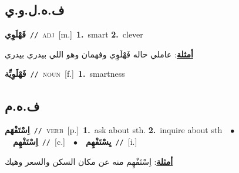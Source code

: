 \documentclass[10pt,a4paper,twoside]{article} %
\begin{document}
\begin{multicols}{2}
\vspace{-3mm}
\subsection*{\color{blue}\foreignlanguage{arabic}{ف.ه.ل.و.ي}\color{blue}{ (ntws)}} 

{\setlength\topsep{0pt}\textbf{\foreignlanguage{arabic}{فَهْلَوِي}}\ {\color{gray}\texttt{//}\color{black}}\ \textsc{adj}\ [m.]\ \textbf{1.}~smart  \textbf{2.}~clever\  \begin{flushright}\color{gray}\foreignlanguage{arabic}{\textbf{\underline{\foreignlanguage{arabic}{أمثلة}}}: عاملي حاله فَهْلَوِي وفهمان وهو اللي بيدري بيدري}\end{flushright}\color{black}} \vspace{2mm}

{\setlength\topsep{0pt}\textbf{\foreignlanguage{arabic}{فَهْلَوِيِّة}}\ {\color{gray}\texttt{//}\color{black}}\ \textsc{noun}\ [f.]\ \textbf{1.}~smartness\ } \vspace{2mm}

\vspace{-3mm}
\subsection*{\color{blue}\foreignlanguage{arabic}{ف.ه.م}\color{blue}{}} 

{\setlength\topsep{0pt}\textbf{\foreignlanguage{arabic}{اِسْتَفْهَم}}\ {\color{gray}\texttt{//}\color{black}}\ \textsc{verb}\ [p.]\ \textbf{1.}~ask about sth.  \textbf{2.}~inquire about sth\ \ $\bullet$\ \ \setlength\topsep{0pt}\textbf{\foreignlanguage{arabic}{اِسْتَفْهِم}}\ {\color{gray}\texttt{//}\color{black}}\ [c.]\ \ $\bullet$\ \ \setlength\topsep{0pt}\textbf{\foreignlanguage{arabic}{يِسْتَفْهِم}}\ {\color{gray}\texttt{//}\color{black}}\ [i.]\  \begin{flushright}\color{gray}\foreignlanguage{arabic}{\textbf{\underline{\foreignlanguage{arabic}{أمثلة}}}: اِسْتَفْهِم منه عن مكان السكن والسعر وهيك}\end{flushright}\color{black}} \vspace{2mm}


\end{multicols}
\end{document}
